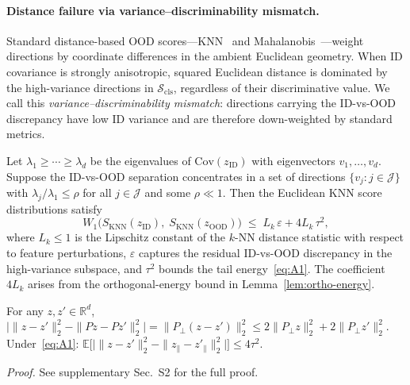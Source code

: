 \documentclass[runningheads]{llncs}
\begin{document}
\paragraph{Distance failure via variance--discriminability mismatch.}
Standard distance-based OOD scores---KNN~\cite{Sun2022knn} and Mahalanobis~\cite{Lee2018maha}---weight directions by coordinate differences in the ambient Euclidean geometry.
When ID covariance is strongly anisotropic, squared Euclidean distance is dominated by the high-variance directions in $\mathcal{S}_{\mathrm{cls}}$, regardless of their discriminative value.
We call this \emph{variance--discriminability mismatch}: directions carrying the ID-vs-OOD discrepancy have low ID variance and are therefore down-weighted by standard metrics.

\begin{theorem}\label{thm:dist-fail}
Let $\lambda_1 \ge \cdots \ge \lambda_d$ be the eigenvalues of $\mathrm{Cov}(z_{\mathrm{ID}})$ with eigenvectors $v_1,\ldots,v_d$.
Suppose the ID-vs-OOD separation concentrates in a set of directions $\{v_j : j \in \mathcal{J}\}$ with $\lambda_j / \lambda_1 \le \rho$ for all $j \in \mathcal{J}$ and some $\rho \ll 1$.
Then the Euclidean KNN score distributions satisfy
\begin{equation}
  W_1\!\bigl(S_{\mathrm{KNN}}(z_{\mathrm{ID}}),\; S_{\mathrm{KNN}}(z_{\mathrm{OOD}})\bigr) \;\le\; L_k\,\varepsilon + 4L_k\,\tau^2,
  \label{eq:knn-fail}
\end{equation}
where $L_k \le 1$ is the Lipschitz constant of the $k$-NN distance statistic with respect to feature perturbations, $\varepsilon$ captures the residual ID-vs-OOD discrepancy in the high-variance subspace, and $\tau^2$ bounds the tail energy~\eqref{eq:A1}.
The coefficient $4L_k$ arises from the orthogonal-energy bound in Lemma~\ref{lem:ortho-energy}.
\end{theorem}

\begin{lemma}\label{lem:ortho-energy}
For any $z, z' \in \mathbb{R}^d$,
$\bigl|\|z - z'\|_2^2 - \|Pz - Pz'\|_2^2\bigr| = \|P_\perp(z - z')\|_2^2 \le 2\|P_\perp z\|_2^2 + 2\|P_\perp z'\|_2^2.$
Under~\eqref{eq:A1}: $\mathbb{E}\bigl[\bigl|\|z - z'\|_2^2 - \|z_\parallel - z'_\parallel\|_2^2\bigr|\bigr] \le 4\tau^2$.
\end{lemma}

\noindent\emph{Proof.} See supplementary Sec.~S2 for the full proof.
\end{document}
